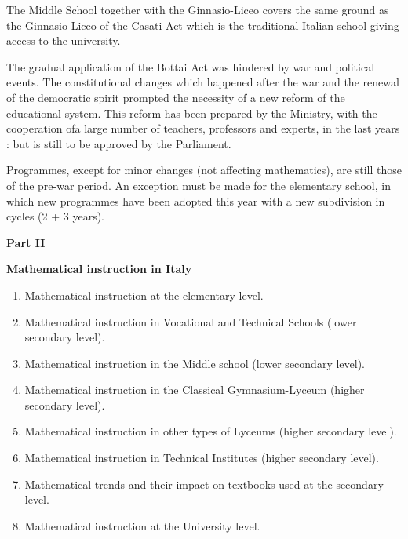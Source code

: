 The Middle School together with the Ginnasio-Liceo covers the same ground as the Ginnasio-Liceo of the Casati Act which is the traditional Italian school giving access to the university.

The gradual application of the Bottai Act was hindered by war and political events. The constitutional changes which happened after the war and the renewal of the democratic spirit prompted the necessity of a new reform of the educational system. This reform has been prepared by the Ministry, with the cooperation of\pageoriginale a large number of teachers, professors and experts, in the last years : but is still to be approved by the Parliament.

Programmes, except for minor changes (not affecting mathematics), are still those of the pre-war period. An exception must be made for the elementary school, in which new programmes have been adopted this year with a new subdivision in cycles (2 + 3 years).

 
\medskip
\begin{center}
{\large\bf Part II}\relax
\bigskip

{\bf Mathematical instruction in Italy}
\end{center}
\begin{enumerate}
\item Mathematical instruction at the elementary level.

\item Mathematical instruction in Vocational and Technical Schools (lower secondary level).

\item Mathematical instruction in the Middle school (lower secondary level).

\item Mathematical instruction in the Classical Gymnasium-Lyceum (higher secondary level).

\item Mathematical instruction in other types of Lyceums (higher secondary level).

\item Mathematical instruction in Technical Institutes (higher secondary level).

\item Mathematical trends and their impact on textbooks used at the secondary level.

\item Mathematical instruction at the University level.
\end{enumerate}

